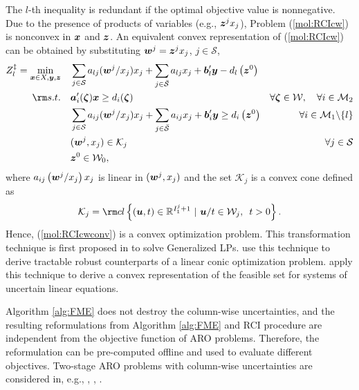 \documentclass[fleqn,isre,blindrev]{informs4}
\newcommand{\mb}[1]{\mbox{\boldmath \ensuremath{#1}}}
\begin{document}
		The  $l$-th inequality is redundant if the optimal objective value is nonnegative. Due to the presence of products of variables (e.g., $\mb{z}^j x_j$), Problem (\ref{mol:RCIcw}) is nonconvex in $\mb{x}$ and $\mb{z}$. An equivalent convex representation of (\ref{mol:RCIcw}) can be obtained by substituting $\mb{w}^j= \mb{z}^j x_j$, $j \in \mathcal{S}$,
\begin{equation} \label{mol:RCIcwconv}
			\begin{aligned} 
				Z^\ddag_l =	\min_{ \boldsymbol{x} \in X , \boldsymbol{y}, \boldsymbol{z}} \quad &  \sum_{j\in \mathcal{S}} a_{lj}(\mb{w}^j/x_j)  x_j + \sum_{j\in \bar{\mathcal{S} }} a_{lj} x_j  + \mb{b}'_l \mb{y} - d_l\left(\mb{z}^0\right)  \\
				{\rm s.t.}  \quad &  \mb{a}'_i(\mb{\zeta})\mb{x} \geq d_i(\mb{\zeta}) &  \forall  \mb{\zeta} \in  \mathcal{W}, \quad \forall i  \in \mathcal{M}_2  \\
				\quad &  \sum_{j\in \mathcal{S}} a_{ij}(\mb{w}^j/x_j) x_j + \sum_{j\in \bar{\mathcal{S} }} a_{ij} x_j  +\mb{b}'_i \mb{y} \geq d_i\left(\mb{z}^0\right) &  \forall i  \in \mathcal{M}_1 \backslash \{l\} \\
				\quad & (\mb{w}^j,x_j) \in \mathcal{K}_j & \forall   j \in \mathcal{S}\\
				\quad & \mb{z}^0 \in \mathcal{W}_0,
			\end{aligned}
\end{equation}
		where $a_{ij}\left(\mb{w}^j/x_j\right)x_j$ is linear in  $(\mb{w}^j,x_j)$ and the set $\mathcal{K}_j $ is a convex cone defined as 
\begin{equation*}
		\mathcal{K}_j  = {\rm cl}\left\{ (\mb{u},t) \in \mathbb{R}^{I^j_1+1}~|~ \mb{u}/t \in \mathcal{W}_j, \enskip t>0\right\}. 
\end{equation*}
		Hence, (\ref{mol:RCIcwconv}) is a convex optimization problem. This transformation technique is first proposed in \cite{d63} to solve Generalized LPs. \cite{gbbd14} use this technique to derive tractable robust counterparts of a linear conic optimization problem. \cite{zd17} apply this technique to derive a convex representation of the feasible set for systems of uncertain linear equations.
		
		Algorithm \ref{alg:FME} does not destroy the column-wise uncertainties,  {and the resulting reformulations from Algorithm \ref{alg:FME} and RCI procedure are independent from the objective function of ARO problems. Therefore, the reformulation can be pre-computed offline and used to evaluate different objectives.} Two-stage ARO problems with column-wise uncertainties are considered in, e.g.,  \cite{m11}, \cite{ad16a}, \cite{xb16}. 
		
\end{document}
